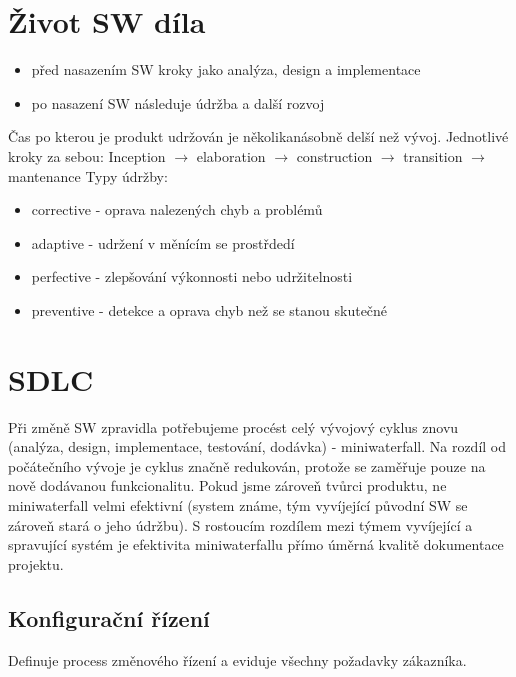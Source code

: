 \documentclass{szzclass}
\begin{document}
\tableofcontents
\newpage

\section{Život SW díla}
\begin{itemize}
    \item před nasazením SW kroky jako analýza, design a implementace
    \item po nasazení SW následuje údržba a další rozvoj
\end{itemize}
Čas po kterou je produkt udržován je několikanásobně delší než vývoj. Jednotlivé kroky za sebou:
\newline
Inception $\rightarrow$ elaboration $\rightarrow$ construction $\rightarrow$ transition $\rightarrow$ mantenance
\newline
Typy údržby:
\begin{itemize}
    \item corrective - oprava nalezených chyb a problémů
    \item adaptive - udržení v měnícím se prostřdedí
    \item perfective - zlepšování výkonnosti nebo udržitelnosti
    \item preventive - detekce a oprava chyb než se stanou skutečné
\end{itemize}

\section{SDLC}
Při změně SW zpravidla potřebujeme procést celý vývojový cyklus znovu (analýza, design, implementace, testování, dodávka) - miniwaterfall.
\newline
Na rozdíl od počátečního vývoje je cyklus značně redukován, protože se zaměřuje pouze na nově dodávanou funkcionalitu.
\newline
Pokud jsme zároveň tvůrci produktu, ne miniwaterfall velmi efektivní (system známe, tým vyvíjející původní SW se zároveň stará o jeho údržbu).
\newline
S rostoucím rozdílem mezi týmem vyvíjející a spravující systém je efektivita miniwaterfallu přímo úměrná kvalitě dokumentace projektu.

\subsection{Konfigurační řízení}
Definuje process změnového řízení a eviduje všechny požadavky zákazníka.
\end{document}
